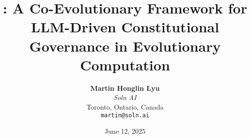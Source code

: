 




\title{\textbf{\acgsbold{}: A Co-Evolutionary Framework for LLM-Driven Constitutional Governance in Evolutionary Computation}}

\author{
    \textbf{Martin Honglin Lyu}\\
    \textit{Soln AI}\\
    Toronto, Ontario, Canada\\
    \texttt{martin@soln.ai}
}

\date{June 12, 2025}

\maketitle

